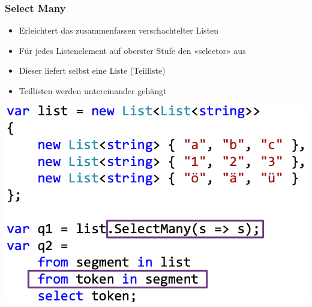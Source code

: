 \subsubsection{Select Many}
\begin{itemize}
    \item Erleichtert das zusammenfassen verschachtelter Listen
    \item Für jedes Listenelement auf oberster Stufe den «selector» aus
    \item Dieser liefert selbst eine Liste (Teilliste)
    \item Teillisten werden untereinander gehängt
\end{itemize}
\vspace{-8pt}
\begin{center}
    \includegraphics[scale=.3]{graphic/linq/Select Many.png}
\end{center}
\vspace{-8pt}


\newpage